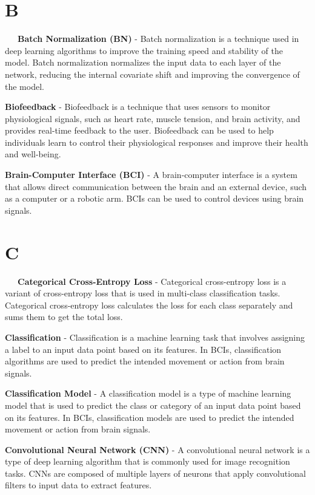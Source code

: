 \section*{B}

\-\ \-\ \-\ \textbf{Batch Normalization (BN)} - Batch normalization is a technique used in deep learning algorithms to improve the training speed and stability of the model. Batch normalization normalizes the input data to each layer of the network, reducing the internal covariate shift and improving the convergence of the model.

\textbf{Biofeedback} - Biofeedback is a technique that uses sensors to monitor physiological signals, such as heart rate, muscle tension, and brain activity, and provides real-time feedback to the user. Biofeedback can be used to help individuals learn to control their physiological responses and improve their health and well-being.

\textbf{Brain-Computer Interface (BCI)} - A brain-computer interface is a system that allows direct communication between the brain and an external device, such as a computer or a robotic arm. BCIs can be used to control devices using brain signals.

\section*{C}

\-\ \-\ \-\ \textbf{Categorical Cross-Entropy Loss} - Categorical cross-entropy loss is a variant of cross-entropy loss that is used in multi-class classification tasks. Categorical cross-entropy loss calculates the loss for each class separately and sums them to get the total loss.

\textbf{Classification} - Classification is a machine learning task that involves assigning a label to an input data point based on its features. In BCIs, classification algorithms are used to predict the intended movement or action from brain signals.

\textbf{Classification Model} - A classification model is a type of machine learning model that is used to predict the class or category of an input data point based on its features. In BCIs, classification models are used to predict the intended movement or action from brain signals.

\textbf{Convolutional Neural Network (CNN)} - A convolutional neural network is a type of deep learning algorithm that is commonly used for image recognition tasks. CNNs are composed of multiple layers of neurons that apply convolutional filters to input data to extract features.

